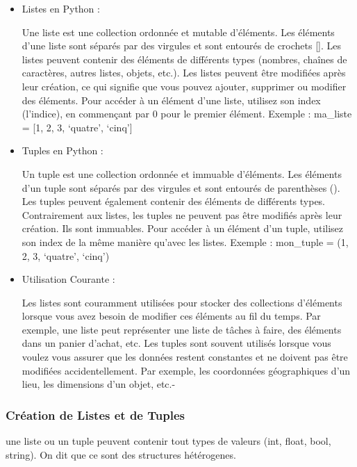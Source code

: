 \documentclass[11pt]{article}
\begin{document}
\begin{itemize}
\item
  Listes en Python :

  Une liste est une collection ordonnée et mutable d'éléments. Les
  éléments d'une liste sont séparés par des virgules et sont entourés de
  crochets {[}{]}. Les listes peuvent contenir des éléments de
  différents types (nombres, chaînes de caractères, autres listes,
  objets, etc.). Les listes peuvent être modifiées après leur création,
  ce qui signifie que vous pouvez ajouter, supprimer ou modifier des
  éléments. Pour accéder à un élément d'une liste, utilisez son index
  (l'indice), en commençant par 0 pour le premier élément. Exemple :
  ma\_liste = {[}1, 2, 3, `quatre', `cinq'{]}
\item
  Tuples en Python :

  Un tuple est une collection ordonnée et immuable d'éléments. Les
  éléments d'un tuple sont séparés par des virgules et sont entourés de
  parenthèses (). Les tuples peuvent également contenir des éléments de
  différents types. Contrairement aux listes, les tuples ne peuvent pas
  être modifiés après leur création. Ils sont immuables. Pour accéder à
  un élément d'un tuple, utilisez son index de la même manière qu'avec
  les listes. Exemple : mon\_tuple = (1, 2, 3, `quatre', `cinq')
\item
  Utilisation Courante :

  Les listes sont couramment utilisées pour stocker des collections
  d'éléments lorsque vous avez besoin de modifier ces éléments au fil du
  temps. Par exemple, une liste peut représenter une liste de tâches à
  faire, des éléments dans un panier d'achat, etc. Les tuples sont
  souvent utilisés lorsque vous voulez vous assurer que les données
  restent constantes et ne doivent pas être modifiées accidentellement.
  Par exemple, les coordonnées géographiques d'un lieu, les dimensions
  d'un objet, etc.-
\end{itemize}

    \hypertarget{cruxe9ation-de-listes-et-de-tuples}{%
\subsubsection{Création de Listes et de
Tuples}\label{cruxe9ation-de-listes-et-de-tuples}}

une liste ou un tuple peuvent contenir tout types de valeurs (int,
float, bool, string). On dit que ce sont des structures hétérogenes.
\end{document}
